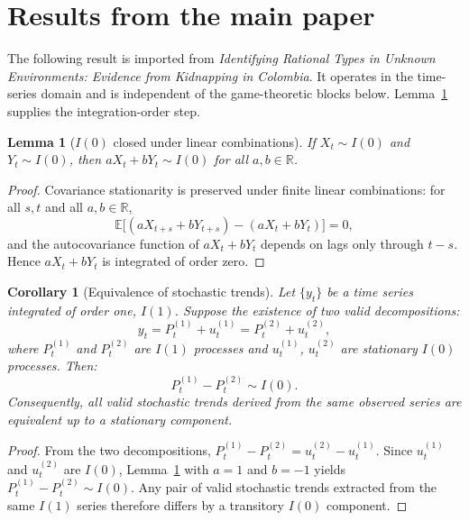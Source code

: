 \documentclass[ecta,nameyear,final,supplement]{econsocart}
\numberwithin{equation}{section}
\numberwithin{table}{section}
\newtheorem{lemma}[theorem]{Lemma}
\newtheorem{corollary}[theorem]{Corollary}
\theoremstyle{definition}
\newcommand{\E}{\mathbb{E}}
\begin{document}
\section{Results from the main paper}
\label{sec:main}

\noindent The following result is imported from
\textit{Identifying Rational Types in Unknown Environments: Evidence from
Kidnapping in Colombia}. It operates in the time-series domain and is
independent of the game-theoretic blocks below. Lemma~\ref{lem:I0-closed}
supplies the integration-order step.


\begin{lemma}[$I(0)$ closed under linear combinations]
\label{lem:I0-closed}
If $X_t\sim I(0)$ and $Y_t\sim I(0)$, then $aX_t+bY_t\sim I(0)$ for all
$a,b\in\mathbb{R}$.
\end{lemma}

\begin{proof}
Covariance stationarity is preserved under finite linear combinations: for all
$s,t$ and all $a,b\in\mathbb{R}$,
\[
\E\bigl[(aX_{t+s}+bY_{t+s})-(aX_t+bY_t)\bigr]=0,
\]
and the autocovariance function of $aX_t+bY_t$ depends on lags only through
$t-s$. Hence $aX_t+bY_t$ is integrated of order zero.
\end{proof}

\bigskip

\begin{corollary}[Equivalence of stochastic trends]
\label{cor:trend_equivalence}
Let $\{y_t\}$ be a time series integrated of order one, $I(1)$. Suppose the
existence of two valid decompositions:
\[
y_t = P_t^{(1)} + u_t^{(1)} = P_t^{(2)} + u_t^{(2)},
\]
where $P_t^{(1)}$ and $P_t^{(2)}$ are $I(1)$ processes and $u_t^{(1)}$,
$u_t^{(2)}$ are stationary $I(0)$ processes. Then:
\[
P_t^{(1)} - P_t^{(2)} \sim I(0).
\]
Consequently, all valid stochastic trends derived from the same observed
series are equivalent up to a stationary component.
\end{corollary}

\begin{proof}
From the two decompositions,
$P_t^{(1)}-P_t^{(2)}=u_t^{(2)}-u_t^{(1)}$. Since $u_t^{(1)}$ and $u_t^{(2)}$
are $I(0)$, Lemma~\ref{lem:I0-closed} with $a=1$ and $b=-1$ yields
$P_t^{(1)}-P_t^{(2)}\sim I(0)$. Any pair of valid stochastic trends extracted
from the same $I(1)$ series therefore differs by a transitory $I(0)$ component.
\end{proof}
\end{document}
